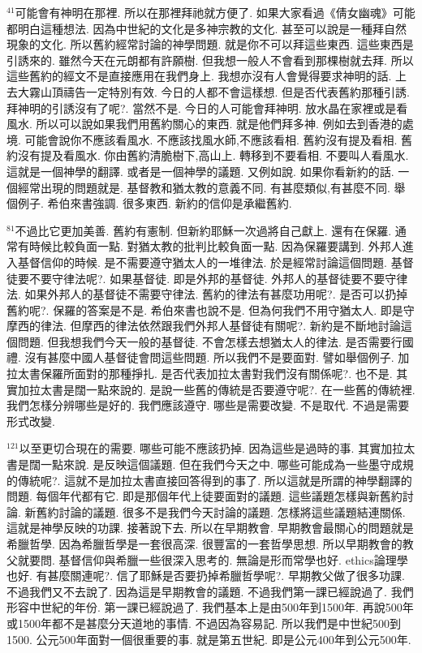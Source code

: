 \documentclass{book}
\begin{document}
$^{41}$可能會有神明在那裡.
所以在那裡拜祂就方便了.
如果大家看過《倩女幽魂》可能都明白這種想法.
因為中世紀的文化是多神宗教的文化.
甚至可以說是一種拜自然現象的文化.
所以舊約經常討論的神學問題.
就是你不可以拜這些東西.
這些東西是引誘來的.
雖然今天在元朗都有許願樹.
但我想一般人不會看到那棵樹就去拜.
所以這些舊約的經文不是直接應用在我們身上.
我想亦沒有人會覺得要求神明的話.
上去大霧山頂禱告一定特別有效.
今日的人都不會這樣想.
但是否代表舊約那種引誘.
拜神明的引誘沒有了呢?.
當然不是.
今日的人可能會拜神明.
放水晶在家裡或是看風水.
所以可以說如果我們用舊約關心的東西.
就是他們拜多神.
例如去到香港的處境.
可能會說你不應該看風水.
不應該找風水師,不應該看相.
舊約沒有提及看相.
舊約沒有提及看風水.
你由舊約清脆樹下,高山上.
轉移到不要看相.
不要叫人看風水.
這就是一個神學的翻譯.
或者是一個神學的議題.
又例如說.
如果你看新約的話.
一個經常出現的問題就是.
基督教和猶太教的意義不同.
有甚麼類似,有甚麼不同.
舉個例子.
希伯來書強調.
很多東西.
新約的信仰是承繼舊約.

$^{81}$不過比它更加美善.
舊約有憲制.
但新約耶穌一次過將自己獻上.
還有在保羅.
通常有時候比較負面一點.
對猶太教的批判比較負面一點.
因為保羅要講到.
外邦人進入基督信仰的時候.
是不需要遵守猶太人的一堆律法.
於是經常討論這個問題.
基督徒要不要守律法呢?.
如果基督徒.
即是外邦的基督徒.
外邦人的基督徒要不要守律法.
如果外邦人的基督徒不需要守律法.
舊約的律法有甚麼功用呢?.
是否可以扔掉舊約呢?.
保羅的答案是不是.
希伯來書也說不是.
但為何我們不用守猶太人.
即是守摩西的律法.
但摩西的律法依然跟我們外邦人基督徒有關呢?.
新約是不斷地討論這個問題.
但我想我們今天一般的基督徒.
不會怎樣去想猶太人的律法.
是否需要行國禮.
沒有甚麼中國人基督徒會問這些問題.
所以我們不是要面對.
譬如舉個例子.
加拉太書保羅所面對的那種掙扎.
是否代表加拉太書對我們沒有關係呢?.
也不是.
其實加拉太書是闊一點來說的.
是說一些舊的傳統是否要遵守呢?.
在一些舊的傳統裡.
我們怎樣分辨哪些是好的.
我們應該遵守.
哪些是需要改變.
不是取代.
不過是需要形式改變.

$^{121}$以至更切合現在的需要.
哪些可能不應該扔掉.
因為這些是過時的事.
其實加拉太書是闊一點來說.
是反映這個議題.
但在我們今天之中.
哪些可能成為一些墨守成規的傳統呢?.
這就不是加拉太書直接回答得到的事了.
所以這就是所謂的神學翻譯的問題.
每個年代都有它.
即是那個年代上徒要面對的議題.
這些議題怎樣與新舊約討論.
新舊約討論的議題.
很多不是我們今天討論的議題.
怎樣將這些議題結連關係.
這就是神學反映的功課.
接著說下去.
所以在早期教會.
早期教會最關心的問題就是希臘哲學.
因為希臘哲學是一套很高深.
很豐富的一套哲學思想.
所以早期教會的教父就要問.
基督信仰與希臘一些很深入思考的.
無論是形而常學也好.
ethics論理學也好.
有甚麼關連呢?.
信了耶穌是否要扔掉希臘哲學呢?.
早期教父做了很多功課.
不過我們又不去說了.
因為這是早期教會的議題.
不過我們第一課已經說過了.
我們形容中世紀的年份.
第一課已經說過了.
我們基本上是由500年到1500年.
再說500年或1500年都不是甚麼分天道地的事情.
不過因為容易記.
所以我們是中世紀500到1500.
公元500年面對一個很重要的事.
就是第五世紀.
即是公元400年到公元500年.
\end{document}
